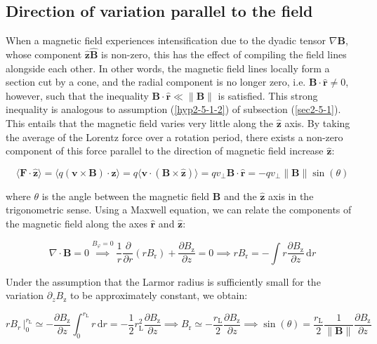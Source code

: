 \subsection{Direction of variation parallel to the field}

\label{sec2-5-2}

When a magnetic field experiences intensification due to the dyadic tensor $\nabla\mathbf{B}$, whose component $\mathbf{\hat{z}}\mathbf{\hat{B}}$ is non-zero, this has the effect of compiling the field lines alongside each other. In other words, the magnetic field lines locally form a section cut by a cone, and the radial component is no longer zero, i.e. $\mathbf{B}\cdot\mathbf{\hat{r}}\neq0$, however, such that the inequality $\mathbf{B}\cdot\mathbf{\hat{r}}\ll\|\mathbf{B}\|$ is satisfied. This strong inequality is analogous to assumption (\ref{hyp2-5-1-2}) of subsection (\ref{sec2-5-1}). This entails that the magnetic field varies very little along the $\mathbf{\hat{z}}$ axis.
By taking the average of the Lorentz force over a rotation period, there exists a non-zero component of this force parallel to the direction of magnetic field increase $\mathbf{\hat{z}}$:

\begin{equation}
    \langle\mathbf{F}\cdot\mathbf{\hat{z}}\rangle=\langle q(\mathbf{v}\times\mathbf{B})\cdot\mathbf{z}\rangle=q\langle\mathbf{v}\cdot(\mathbf{B}\times\mathbf{\hat{z}})\rangle=qv_\perp\mathbf{B}\cdot\mathbf{\hat{r}}=-qv_\perp\|\mathbf{B}\|\sin(\theta)
\end{equation}

where $\theta$ is the angle between the magnetic field $\mathbf{B}$ and the $\mathbf{\hat{z}}$ axis in the trigonometric sense. Using a Maxwell equation, we can relate the components of the magnetic field along the axes $\mathbf{\hat{r}}$ and $\mathbf{\hat{z}}$:

\begin{equation}
    \nabla\cdot\mathbf{B}=0\stackrel{B_\varphi=0}{\implies}\frac{1}{r}\frac{\partial}{\partial r}(rB_\text{r})+\frac{\partial B_\text{z}}{\partial z}=0\implies rB_\text{r}=-\int r\frac{\partial B_\text{z}}{\partial z}\,\mathrm{d}r
\end{equation}

Under the assumption that the Larmor radius is sufficiently small for the variation $\partial_zB_\text{z}$ to be approximately constant, we obtain:

\begin{equation}
    rB_r\,\bigg|_0^{r_\text{L}}\simeq-\frac{\partial B_\text{z}}{\partial z}\int_0^{r_\text{L}}r\,\mathrm{d}r=-\frac{1}{2}r_\text{L}^2\frac{\partial B_\text{z}}{\partial z}\implies B_\text{r}\simeq-\frac{r_\text{L}}{2}\frac{\partial B_\text{z}}{\partial z}\implies\sin(\theta)=\frac{r_\text{L}}{2}\frac{1}{\|\mathbf{B}\|}\frac{\partial B_\text{z}}{\partial z}
\end{equation}

